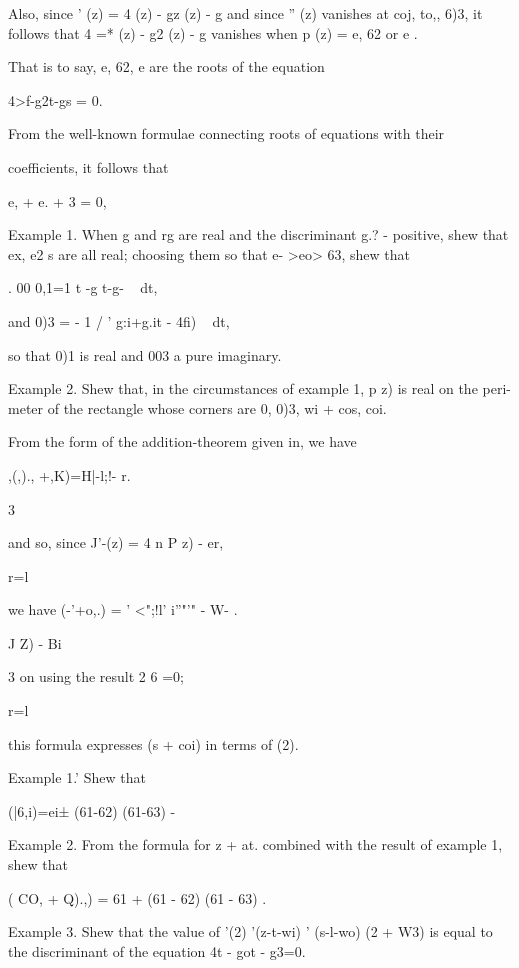 {Also, since ' (z) = 4 (z) - gz (z) - g and since '' (z) vanishes at
coj, to,, 6)3, it follows that 4 =* (z) - g2 (z) - g vanishes when p
(z) = e, 62 or e .

That is to say, e, 62, e are the roots of the equation

4>f-g2t-gs = 0.

%
%

From the well-known formulae connecting roots of equations with their

coefficients, it follows that

e, + e. + 3 = 0,

Example 1. When g and rg are real and the discriminant g.? - %
positive, shew that ex, e2 s are all real; choosing them so that e-
>eo> 63, shew that

. 00 0,1=1 t -g t-g- ~ dt,

and 0)3 = - 1 / ' g:i+g.it - 4fi) ~ dt,

so that 0)1 is real and 003 a pure imaginary.

Example 2. Shew that, in the circumstances of example 1, p z) is real
on the peri- meter of the rectangle whose corners are 0, 0)3, wi +
cos, coi.

From the form of the addition-theorem given in, we have

,(,)., +,K)=H|-l;!- r.

3

and so, since J'-(z) = 4 n P z) - er,

r=l

we have (-'+o,.) = ' <";!l' i''"'" - W- .

 J Z) - Bi

3 on using the result 2 6 =0;

r=l

this formula expresses (s + coi) in terms of (2).

Example 1.' Shew that

  (|6,i)=ei± (61-62) (61-63) - 

Example 2. From the formula for z + at. combined with the result of
example 1, shew that

  ( CO, + Q).,) = 61 + (61 - 62) (61 - 63) .


Example 3. Shew that the value of '(2) '(z-t-wi) ' (s-l-wo) (2 + W3)
is equal to the discriminant of the equation 4t - got - g3=0.

}
